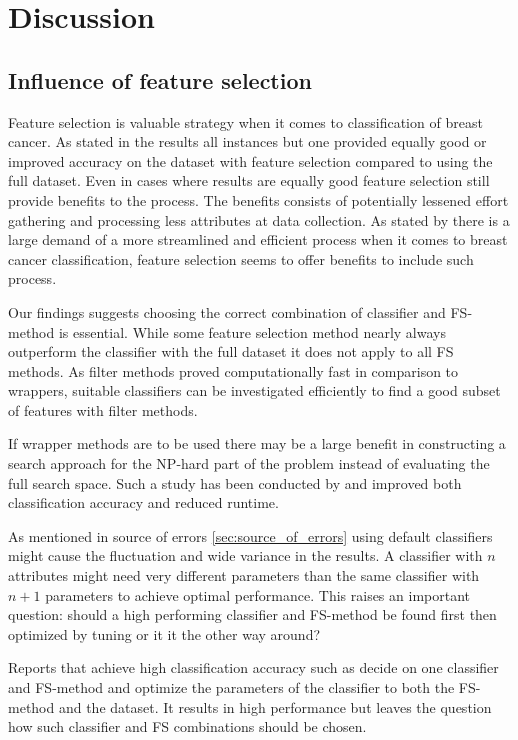 \chapter{Discussion}

\section{Influence of feature selection}

Feature selection is valuable strategy when it comes to classification of breast cancer. As stated in the results all instances but one provided equally good or improved accuracy on the dataset with feature selection compared to using the full dataset. Even in cases where results are equally good feature selection still provide benefits to the process. The benefits consists of potentially lessened effort gathering and processing less attributes at data collection. As stated by \textcite{martei2018} there is a large demand of a more streamlined and efficient process when it comes to breast cancer classification, feature selection seems to offer benefits to include such process.

Our findings suggests choosing the correct combination of classifier and FS-method is essential. While some feature selection method nearly always outperform the classifier with the full dataset it does not apply to all FS methods. As filter methods proved computationally fast in comparison to wrappers, suitable classifiers can be investigated efficiently to find a good subset of features with filter methods.

If wrapper methods are to be used there may be a large benefit in constructing a search approach for the NP-hard part of the problem instead of evaluating the full search space. Such a study has been conducted by \textcite{panthong2015} and improved both classification accuracy and reduced runtime.

As mentioned in source of errors \ref{sec:source_of_errors} using default classifiers might cause the fluctuation and wide variance in the results. A classifier with $n$ attributes might need very different parameters than the same classifier with $n + 1$ parameters to achieve optimal performance. This raises an important question: should a high performing classifier and FS-method be found first then optimized by tuning or it it the other way around?

Reports that achieve high classification accuracy such as \textcite{akay2009} decide on one classifier and FS-method and optimize the parameters of the classifier to both the FS-method and the dataset. It results in high performance but leaves the question how such classifier and FS combinations should be chosen.

